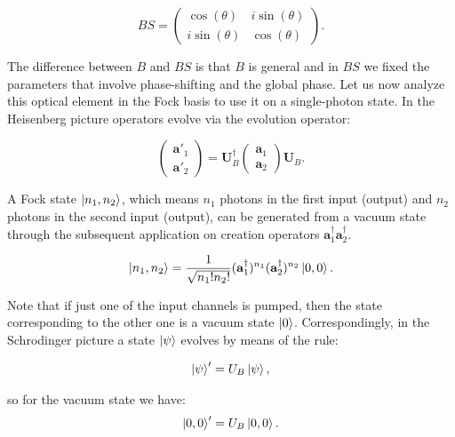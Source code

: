 \documentclass[12pt]{book}
\begin{document}
\begin{equation}
BS=\begin{pmatrix} \cos(\theta) & i \sin(\theta) \\ i \sin(\theta) & \cos(\theta) \end{pmatrix}.\label{BS_matrix}
\end{equation}


The difference between $B$ and $BS$ is that $B$ is general and in $BS$ we fixed the parameters that involve phase-shifting and the global phase. Let us now analyze this optical element in the Fock basis  to use it on a single-photon state. In the Heisenberg picture operators evolve via the evolution operator:

\begin{equation}
\begin{pmatrix} \mathbf{a}'_{1} \\ \mathbf{a}'_{2}\end{pmatrix}=\mathbf{U}^{\dagger}_{B} \begin{pmatrix} \mathbf{a}_{1} \\ \mathbf{a}_{2}\end{pmatrix} \mathbf{U}_{B}.
\label{Heisenberg}
\end{equation}

A Fock state $\ket{n_{1},n_{2}}$, which means $n_{1}$ photons in the first input (output) and $n_{2}$ photons in the second input (output), can be generated from a vacuum state through the subsequent application on creation operators  $\mathbf{a}^{\dagger}_{1}\mathbf{a}^{\dagger}_{2}$. 

\begin{equation}
 \ket{n_{1},n_{2}}=\frac{1}{\sqrt{n_{1}! n_{2}!}} (\mathbf{a}_{1}^{\dagger})^{n_{1}}(\mathbf{a}_{2}^{\dagger})^{n_{2}} \ket{0,0}.
\end{equation}

Note that if just one of the input channels is pumped, then the state corresponding to the other one is a vacuum state $\ket{0}$. Correspondingly, in the Schrodinger picture a state $\ket{\psi}$ evolves by means of the rule:

\begin{equation}
 \ket{\psi}'=U_{B}\ket{\psi},
\end{equation}

so for the vacuum state we have:
\begin{equation}
 \ket{0,0}'=U_{B}\ket{0,0}.
 \label{evolution}
\end{equation}
\end{document}
